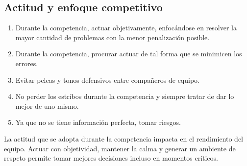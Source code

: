 \subsection{Actitud y enfoque competitivo}
\begin{enumerate}[resume=icpc]
    \item Durante la competencia, actuar objetivamente, enfocándose en resolver la mayor cantidad de problemas con la menor penalización posible.
    \item Durante la competencia, procurar actuar de tal forma que se minimicen los errores.
    \item Evitar peleas y tonos defensivos entre compañeros de equipo.
    \item No perder los estribos durante la competencia y siempre tratar de dar lo mejor de uno mismo.
    \item Ya que no se tiene información perfecta, tomar riesgos.
\end{enumerate}
La actitud que se adopta durante la competencia impacta en el rendimiento del equipo. Actuar con objetividad, mantener la calma y generar un ambiente de respeto permite tomar mejores decisiones incluso en momentos críticos.
\pagebreak
